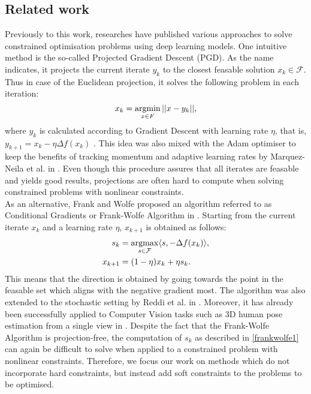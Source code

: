\subsection{Related work}
Previously to this work, researches have published various approaches to solve constrained optimisation problems using deep learning models. One intuitive method is the so-called Projected Gradient Descent (PGD). As the name indicates, it projects the current iterate $y_k$ to the closest feasable solution $x_k \in \mathcal{F}$. Thus in case of the Euclidean projection, it solves the following problem in each iteration:
\[ x_k = \operatorname*{argmin}_{x \in F} ||x - y_k||, \]
where $y_k$ is calculated according to Gradient Descent with learning rate $\eta$, that is, $y_{k+1} = x_k - \eta \Delta f(x_{k})$ \cite{Chen}. This idea was also mixed with the Adam optimiser to keep the benefits of tracking momentum and adaptive learning rates by Marquez-Neila et al. in \cite{DBLP:journals/corr/Marquez-NeilaSF17}. Even though this procedure assures that all iterates are feasable and yields good results, projections are often hard to compute when solving constrained problems with nonlinear constraints. \\
\indent As an alternative, Frank and Wolfe proposed an algorithm referred to as Conditional Gradients or Frank-Wolfe Algorithm in \cite{doi:10.1002/nav.3800030109}. Starting from the current iterate $x_k$ and a learning rate $\eta$, $x_{k+1}$ is obtained as follows:
\begin{subequations}
	\label{eq:frankwolfe}
	\begin{align}
		s_k &= \operatorname*{argmax}_{s \in \mathcal{F}} \langle s, -\Delta f(x_k) \rangle \label{frankwolfe1},\\
		x_{k+1} &= (1-\eta) x_k + \eta s_k.
	\end{align}
\end{subequations}
This means that the direction is obtained by going towards the point in the feasable set which aligns with the negative gradient most. The algorithm was also extended to the stochastic setting by Reddi et al. in \cite{Reddi2016StochasticFM}. Moreover, it has already been successfully applied to Computer Vision tasks such as 3D human pose estimation from a single view in \cite{DBLP:journals/corr/abs-1803-06453}. Despite the fact that the Frank-Wolfe Algorithm is projection-free, the computation of $s_k$ as described in \ref{frankwolfe1} can again be difficult to solve when applied to a constrained problem with nonlinear constraints. Therefore, we focus our work on methods which do not incorporate hard constraints, but instead add soft constraints to the problems to be optimised.


\clearpage

